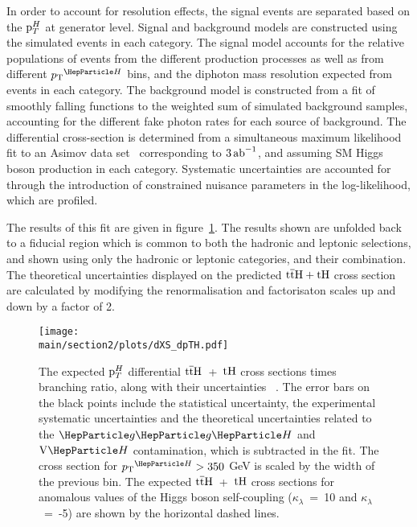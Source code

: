 In order to account for resolution effects, the signal events are separated based on the $\mathrm{p}_{T}^H$ at generator level.   Signal and background models are constructed using the simulated events in each category. The signal model accounts for the relative populations of events from the different production processes as well as from different $\pTH$ bins, and the diphoton mass resolution expected from events in each category. The background model is constructed from a fit of smoothly falling functions to the weighted sum of simulated background samples, accounting for the different fake photon rates for each source of background. The differential cross-section is determined from a simultaneous maximum likelihood fit to an Asimov data set~\cite{Cowan:2010js} corresponding to $3\mbox{\ensuremath{\,\text{ab}^\text{$-$1}}}$, and assuming SM Higgs boson  production in each category.  Systematic uncertainties are accounted for through the introduction of constrained nuisance parameters in the log-likelihood, which are profiled. 

The results of this fit are given in figure~\ref{fig:ttHdiff_CMS_ptH_xs}. The results shown are unfolded back to a fiducial region which is common to both the hadronic and leptonic selections, and shown using only the hadronic or leptonic categories, and their combination. The theoretical uncertainties displayed on the predicted $\text{t}\overline{\text{t}}\text{H}+\text{tH}$ cross section are calculated by modifying the renormalisation and factorisaton scales up and down by a factor of 2.

\begin{figure}[htb!]
        \centering
        \texttt{[image: \\main/section2/plots/dXS\_dpTH.pdf]}
        \caption{The expected $\mathrm{p}_{T}^H$ differential $\text{t}\overline{\text{t}}\text{H}$~+~$\text{tH}$ cross sections times branching ratio, along with their uncertainties ~\cite{CMS-PAS-FTR-18-020}. The error bars on the black points include the statistical uncertainty, the experimental systematic uncertainties and the theoretical uncertainties related to the $\ggh$ and $\vh$ contamination, which is subtracted in the fit.  The cross section for $\pTH > 350$ GeV is scaled by the width of the previous bin. The expected $\text{t}\overline{\text{t}}\text{H}$~+~$\text{tH}$ cross sections for anomalous values of the Higgs boson self-coupling ($\kappa_\lambda$~=~10 and $\kappa_\lambda$~=~-5) are shown by the horizontal dashed lines.}
        \label{fig:ttHdiff_CMS_ptH_xs}
\end{figure}

